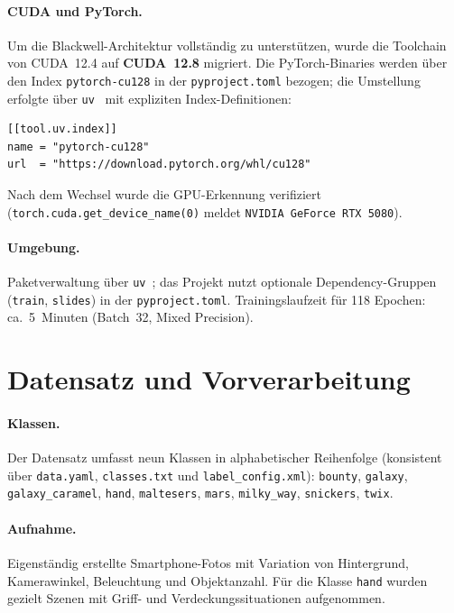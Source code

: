 \documentclass[a4paper, 11pt]{scrartcl}
\begin{document}
\paragraph{CUDA und PyTorch.}
Um die Blackwell-Architektur vollständig zu unterstützen, wurde die Toolchain von CUDA~12.4 auf \textbf{CUDA~12.8} migriert.
Die PyTorch-Binaries werden über den Index \texttt{pytorch-cu128} in der \texttt{pyproject.toml} bezogen; die Umstellung erfolgte über \texttt{uv}~\cite{uv2024} mit expliziten Index-Definitionen:

\begin{verbatim}
[[tool.uv.index]]
name = "pytorch-cu128"
url  = "https://download.pytorch.org/whl/cu128"
\end{verbatim}

Nach dem Wechsel wurde die GPU-Erkennung verifiziert (\texttt{torch.cuda.get\_device\_name(0)} meldet \texttt{NVIDIA GeForce RTX 5080}).

\paragraph{Umgebung.}
Paketverwaltung über \texttt{uv}~\cite{uv2024}; das Projekt nutzt optionale Dependency-Gruppen (\texttt{train}, \texttt{slides}) in der \texttt{pyproject.toml}.
Trainingslaufzeit für 118 Epochen: ca.\ 5~Minuten (Batch~32, Mixed Precision).

\section{Datensatz und Vorverarbeitung}
\label{sec:data}

\paragraph{Klassen.}
Der Datensatz umfasst neun Klassen in alphabetischer Reihenfolge (konsistent über \texttt{data.yaml}, \texttt{classes.txt} und \texttt{label\_config.xml}):
\texttt{bounty}, \texttt{galaxy}, \texttt{galaxy\_caramel}, \texttt{hand}, \texttt{maltesers}, \texttt{mars}, \texttt{milky\_way}, \texttt{snickers}, \texttt{twix}.

\paragraph{Aufnahme.}
Eigenständig erstellte Smartphone-Fotos mit Variation von Hintergrund, Kamerawinkel, Beleuchtung und Objektanzahl.
Für die Klasse \texttt{hand} wurden gezielt Szenen mit Griff- und Verdeckungssituationen aufgenommen.
\end{document}
